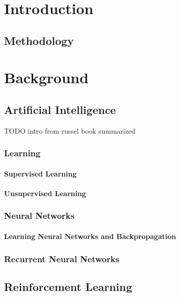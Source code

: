 \chapter{Introduction}

\section{Methodology}


\chapter{Background}
\section{Artificial Intelligence}

 TODO intro from russel book summarized 
\subsection{Learning}

\subsubsection{Supervised Learning}

\subsubsection{Unsupervised Learning}

\subsection{Neural Networks}%
\label{sec:neural_networks}

\subsubsection{Learning Neural Networks and Backpropagation}
\label{sec:Backpropagation}


\subsection{Recurrent Neural Networks}%
\label{sec:recurrent_neural_networks}


\section{Reinforcement Learning}


